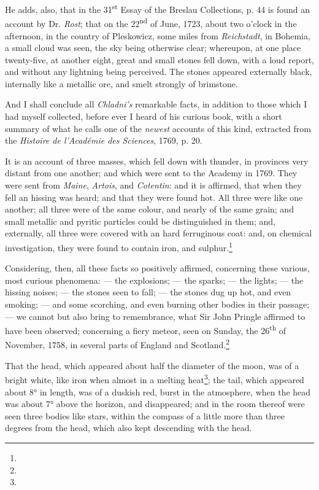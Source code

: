 \documentclass[a4paper, 12pt, oneside]{article}
\begin{document}
He adds, also, that in the 31\textsuperscript{st} Essay of the Breslau Collections, p. 44 is found an account by Dr. \emph{Rost}; that on the 22\textsuperscript{nd} of June, 1723, about two o'clock in the afternoon, in the country of Pleskowicz, some miles from \emph{Reichstadt}, in Bohemia, a small cloud was seen, the sky being otherwise clear; whereupon, at one place twenty-five, at another eight, great and small stones fell down, with a loud report, and without any lightning being perceived. The stones appeared externally black, internally like a metallic ore, and smelt strongly of brimstone.

And I shall conclude all \emph{Chladni's} remarkable facts, in addition to those which I had myself collected, before ever I heard of his curious book, with a short summary of what he calls one of the \emph{newest} accounts of this kind, extracted from the \emph{Histoire de l'Académie des Sciences}, 1769, p. 20.

It is an account of three masses, which fell down with thunder, in provinces very distant from one another; and which were sent to the Academy in 1769. They were sent from \emph{Maine}, \emph{Artois}, and \emph{Cotentin}: and it is affirmed, that when they fell an hissing was heard; and that they were found hot. All three were like one another; all three were of the same colour, and nearly of the same grain; and small metallic and pyritic particles could be distinguished in them; and, externally, all three were covered with an hard ferruginous coat: and, on chemical investigation, they were found to contain iron, and sulphur.\footnote{}

Considering, then, all these facts so positively affirmed, concerning these various, most curious phenomena: --- the explosions; --- the sparks; --- the lights; --- the hissing noises; --- the stones seen to fall; --- the stones dug up hot, and even smoking; --- and some scorching, and even burning other bodies in their passage; --- we cannot but also bring to remembrance, what Sir John Pringle affirmed to have been observed; concerning a fiery meteor, seen on Sunday, the 26\textsuperscript{th} of November, 1758, in several parts of England and Scotland.\footnote{}

That the head, which appeared about half the diameter of the moon, was of a bright white, like iron when almost in a melting heat\footnote{}; the tail, which appeared about 8° in length, was of a duskish red, burst in the atmosphere, when the head was about 7° above the horizon, and disappeared; and in the room thereof were seen three bodies like stars, within the compass of a little more than three degrees from the head, which also kept descending with the head.
\end{document}
